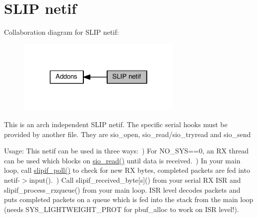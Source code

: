 \hypertarget{group__slipif}{}\section{S\+L\+IP netif}
\label{group__slipif}
Collaboration diagram for S\+L\+IP netif\+:
\nopagebreak
\begin{figure}[H]
\begin{center}
\leavevmode
\includegraphics[width=226pt]{group__slipif}
\end{center}
\end{figure}
This is an arch independent S\+L\+IP netif. The specific serial hooks must be provided by another file. They are sio\+\_\+open, sio\+\_\+read/sio\+\_\+tryread and sio\+\_\+send

Usage\+: This netif can be used in three ways\+:~) For N\+O\+\_\+\+S\+YS==0, an RX thread can be used which blocks on \hyperlink{native_2lwip_2src_2include_2lwip_2sio_8h_ac5a6563ee5f12459451010139a04a03b}{sio\+\_\+read()} until data is received.~) In your main loop, call \hyperlink{native_2lwip_2src_2netif_2slipif_8c_a7b036fd1cde9b299139cac62f52d15a6}{slipif\+\_\+poll()} to check for new RX bytes, completed packets are fed into netif-\/$>$input().~) Call slipif\+\_\+received\+\_\+byte\mbox{[}s\mbox{]}() from your serial RX I\+SR and slipif\+\_\+process\+\_\+rxqueue() from your main loop. I\+SR level decodes packets and puts completed packets on a queue which is fed into the stack from the main loop (needs S\+Y\+S\+\_\+\+L\+I\+G\+H\+T\+W\+E\+I\+G\+H\+T\+\_\+\+P\+R\+OT for pbuf\+\_\+alloc to work on I\+SR level!). 